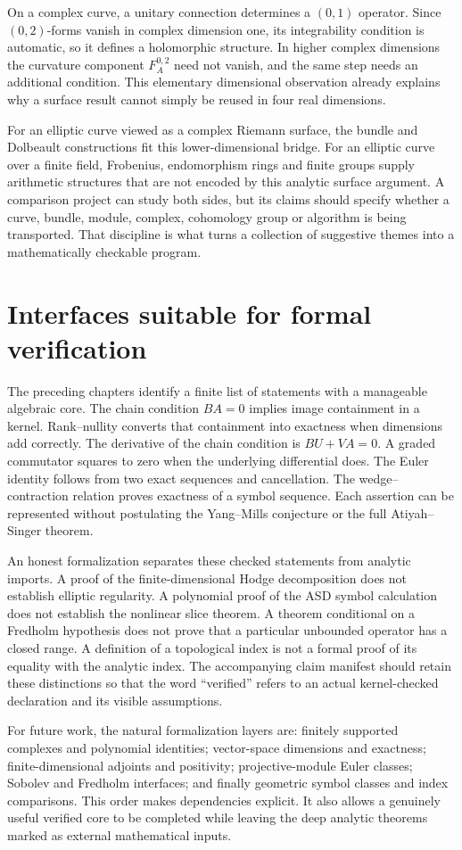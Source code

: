 On a complex curve, a unitary connection determines a $(0,1)$ operator. Since $(0,2)$-forms vanish in complex dimension one, its integrability condition is automatic, so it defines a holomorphic structure. In higher complex dimensions the curvature component $F_A^{0,2}$ need not vanish, and the same step needs an additional condition. This elementary dimensional observation already explains why a surface result cannot simply be reused in four real dimensions.

For an elliptic curve viewed as a complex Riemann surface, the bundle and Dolbeault constructions fit this lower-dimensional bridge. For an elliptic curve over a finite field, Frobenius, endomorphism rings and finite groups supply arithmetic structures that are not encoded by this analytic surface argument. A comparison project can study both sides, but its claims should specify whether a curve, bundle, module, complex, cohomology group or algorithm is being transported. That discipline is what turns a collection of suggestive themes into a mathematically checkable program.

\section{Interfaces suitable for formal verification}

The preceding chapters identify a finite list of statements with a manageable algebraic core. The chain condition $BA=0$ implies image containment in a kernel. Rank--nullity converts that containment into exactness when dimensions add correctly. The derivative of the chain condition is $BU+VA=0$. A graded commutator squares to zero when the underlying differential does. The Euler identity follows from two exact sequences and cancellation. The wedge--contraction relation proves exactness of a symbol sequence. Each assertion can be represented without postulating the Yang--Mills conjecture or the full Atiyah--Singer theorem.

An honest formalization separates these checked statements from analytic imports. A proof of the finite-dimensional Hodge decomposition does not establish elliptic regularity. A polynomial proof of the ASD symbol calculation does not establish the nonlinear slice theorem. A theorem conditional on a Fredholm hypothesis does not prove that a particular unbounded operator has a closed range. A definition of a topological index is not a formal proof of its equality with the analytic index. The accompanying claim manifest should retain these distinctions so that the word ``verified'' refers to an actual kernel-checked declaration and its visible assumptions.

For future work, the natural formalization layers are: finitely supported complexes and polynomial identities; vector-space dimensions and exactness; finite-dimensional adjoints and positivity; projective-module Euler classes; Sobolev and Fredholm interfaces; and finally geometric symbol classes and index comparisons. This order makes dependencies explicit. It also allows a genuinely useful verified core to be completed while leaving the deep analytic theorems marked as external mathematical inputs.
